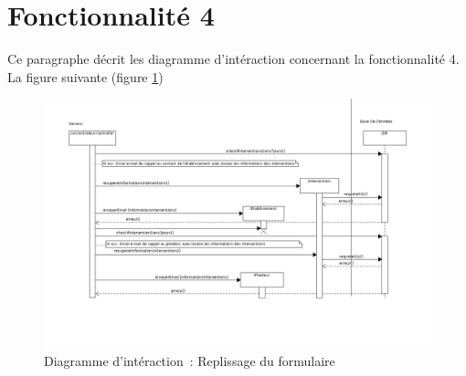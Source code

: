 \section{Fonctionnalité 4}
Ce paragraphe décrit les diagramme d'intéraction concernant la fonctionnalité 4. \\

La figure suivante (figure \ref{diagrammeInteraction5})
\begin{figure}
	\centering
	\includegraphics[scale=0.5]{images/diagrammesInteraction/05_diagrammeInteractionF4.png}
	\caption{Diagramme d'intéraction~: Replissage du formulaire}
	\label{diagrammeInteraction5}
\end{figure}
